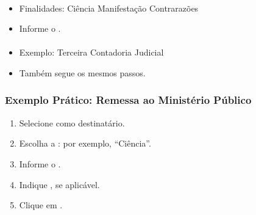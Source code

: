 \documentclass[letterpaper,10pt,brazil]{sphinxmanual}
\begin{document}
\paragraph{}
\label{\detokenize{projud_36_realizarremessa:defensoria-publica}}\begin{itemize}
\item {} 
\sphinxAtStartPar
Finalidades:
\sphinxhyphen{} Ciência
\sphinxhyphen{} Manifestação
\sphinxhyphen{} Contra\sphinxhyphen{}razões

\item {} 
\sphinxAtStartPar
Informe o .

\end{itemize}


\paragraph{}
\label{\detokenize{projud_36_realizarremessa:contadoria-area-civel}}\begin{itemize}
\item {} 
\sphinxAtStartPar
Exemplo: Terceira Contadoria Judicial

\item {} 
\sphinxAtStartPar
Também segue os mesmos passos.

\end{itemize}


\subsubsection{Exemplo Prático: Remessa ao Ministério Público}
\label{\detokenize{projud_36_realizarremessa:exemplo-pratico-remessa-ao-ministerio-publico}}\begin{enumerate}
%
\item {} 
\sphinxAtStartPar
Selecione  como destinatário.

\item {} 
\sphinxAtStartPar
Escolha a : por exemplo, “Ciência”.

\item {} 
\sphinxAtStartPar
Informe o .

\item {} 
\sphinxAtStartPar
Indique , se aplicável.

\item {} 
\sphinxAtStartPar
Clique em .

\end{enumerate}
\end{document}
